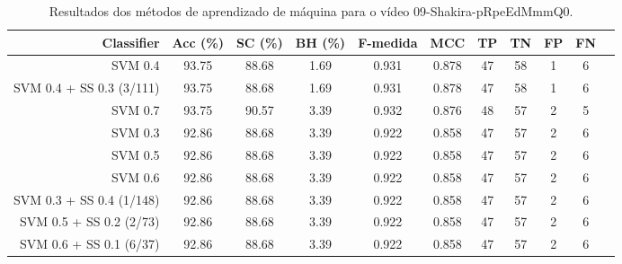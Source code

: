 \begin{table}[!htb]
\centering
\caption{Resultados dos métodos de aprendizado de máquina para o vídeo 09-Shakira-pRpeEdMmmQ0.}
\label{tab:09-Shakira-pRpeEdMmmQ0}
\begin{tabular}{r|c|c|c|c|c|c|c|c|c|c}
\hline\hline
Classifier & Acc (\%) & SC (\%) & BH (\%) & F-medida & MCC & TP & TN & FP & FN \\ \hline
SVM 0.4 & 93.75 & 88.68 & 1.69 & 0.931 & 0.878 & 47 & 58 & 1 & 6 \\ 
SVM 0.4 + SS 0.3 (3/111) & 93.75 & 88.68 & 1.69 & 0.931 & 0.878 & 47 & 58 & 1 & 6 \\ 
SVM 0.7 & 93.75 & 90.57 & 3.39 & 0.932 & 0.876 & 48 & 57 & 2 & 5 \\ 
SVM 0.3 & 92.86 & 88.68 & 3.39 & 0.922 & 0.858 & 47 & 57 & 2 & 6 \\ 
SVM 0.5 & 92.86 & 88.68 & 3.39 & 0.922 & 0.858 & 47 & 57 & 2 & 6 \\ 
SVM 0.6 & 92.86 & 88.68 & 3.39 & 0.922 & 0.858 & 47 & 57 & 2 & 6 \\ 
SVM 0.3 + SS 0.4 (1/148) & 92.86 & 88.68 & 3.39 & 0.922 & 0.858 & 47 & 57 & 2 & 6 \\ 
SVM 0.5 + SS 0.2 (2/73) & 92.86 & 88.68 & 3.39 & 0.922 & 0.858 & 47 & 57 & 2 & 6 \\ 
SVM 0.6 + SS 0.1 (6/37) & 92.86 & 88.68 & 3.39 & 0.922 & 0.858 & 47 & 57 & 2 & 6 \\ 
\hline\hline
\end{tabular}
\end{table}
